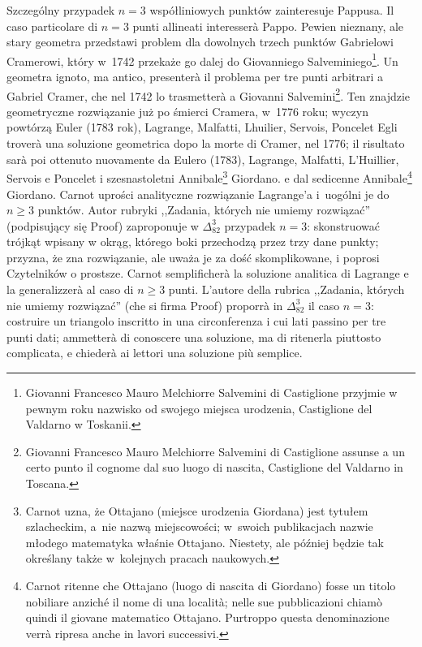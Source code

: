 Szczególny przypadek $n = 3$ współliniowych punktów zainteresuje Pappusa. %
Il caso particolare di $n = 3$ punti allineati interesserà Pappo. %
Pewien nieznany, ale stary geometra przedstawi problem dla dowolnych trzech punktów Gabrielowi Cramerowi, który w~1742 przekaże go dalej do Giovanniego Salveminiego\footnote{Giovanni Francesco Mauro Melchiorre Salvemini di Castiglione przyjmie w pewnym roku nazwisko od swojego miejsca urodzenia, Castiglione del Valdarno w Toskanii.}. %
Un geometra ignoto, ma antico, presenterà il problema per tre punti arbitrari a Gabriel Cramer, che nel 1742 lo trasmetterà a Giovanni Salvemini\footnote{Giovanni Francesco Mauro Melchiorre Salvemini di Castiglione assunse a un certo punto il cognome dal suo luogo di nascita, Castiglione del Valdarno in Toscana.}. %
%
%
Ten znajdzie geometryczne rozwiązanie już po śmierci Cramera, w~1776 roku; wyczyn powtórzą Euler (1783 rok), Lagrange, Malfatti, Lhuilier, Servois, Poncelet %
Egli troverà una soluzione geometrica dopo la morte di Cramer, nel 1776; il risultato sarà poi ottenuto nuovamente da Eulero (1783), Lagrange, Malfatti, L'Huillier, Servois e Poncelet %
%
%
%
%
%
i szesnastoletni Annibale\footnote{Carnot uzna, że Ottajano (miejsce urodzenia Giordana) jest tytułem szlacheckim, a~nie nazwą miejscowości; w~swoich publikacjach nazwie młodego matematyka właśnie Ottajano. Niestety, ale później będzie tak określany także w~kolejnych pracach naukowych.} Giordano. %
e dal sedicenne Annibale\footnote{Carnot ritenne che Ottajano (luogo di nascita di Giordano) fosse un titolo nobiliare anziché il nome di una località; nelle sue pubblicazioni chiamò quindi il giovane matematico Ottajano. Purtroppo questa denominazione verrà ripresa anche in lavori successivi.} Giordano. %
%
Carnot uprości analityczne rozwiązanie Lagrange'a i~uogólni je do $n \ge 3$ punktów. %
Autor rubryki ,,Zadania, których nie umiemy rozwiązać'' (podpisujący się Proof) zaproponuje w $\Delta_{82}^{3}$ przypadek $n = 3$: skonstruować trójkąt wpisany w okrąg, którego boki przechodzą przez trzy dane punkty; przyzna, że zna rozwiązanie, ale uważa je za dość skomplikowane, i poprosi Czytelników o prostsze. %
Carnot semplificherà la soluzione analitica di Lagrange e la generalizzerà al caso di $n \ge 3$ punti. %
L'autore della rubrica ,,Zadania, których nie umiemy rozwiązać'' (che si firma Proof) proporrà in $\Delta_{82}^{3}$ il caso $n = 3$: costruire un triangolo inscritto in una circonferenza i cui lati passino per tre punti dati; ammetterà di conoscere una soluzione, ma di ritenerla piuttosto complicata, e chiederà ai lettori una soluzione più semplice. %
%


%